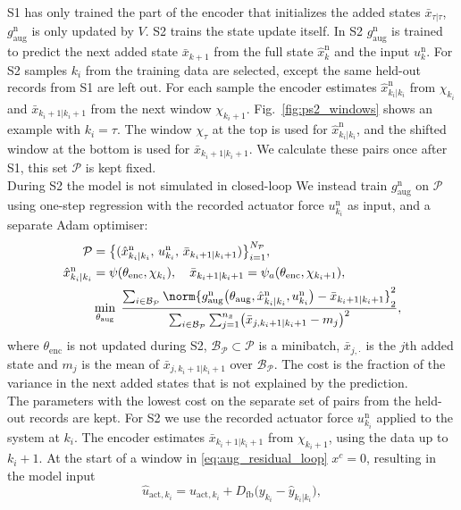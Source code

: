 S1 has only trained the part of the encoder that initializes the 
added states $\bar x_{\tau|\tau}$, $g^{\mathrm n}_{\mathrm{aug}}$ 
is only updated by $V$. 
S2 trains the state update itself.
In S2 $g^{\mathrm n}_{\mathrm{aug}}$ is trained to predict the next
added state $\bar x_{k+1}$ from the full state $\hat x^{\mathrm n}_k$ and the input
$u^{\mathrm n}_k$.
For S2 samples $k_i$ from the training data are selected, 
except the same held-out records from S1 are left out.
For each sample the encoder estimates $\hat x^{\mathrm n}_{k_i|k_i}$ from
$\chi_{k_i}$ and $\bar x_{k_i+1|k_i+1}$ from the next window
$\chi_{k_i+1}$.
Fig.~\ref{fig:ps2_windows} shows an example with $k_i=\tau$.
The window $\chi_\tau$ at the top is used for $\hat x^{\mathrm n}_{k_i|k_i}$,
and the shifted window at the bottom is used for $\bar x_{k_i+1|k_i+1}$.
We calculate these pairs once after S1, this set $\mathcal P$ is kept fixed.
\\
During S2 the model is not simulated in closed-loop 
We instead train $g^{\mathrm n}_{\mathrm{aug}}$ on
$\mathcal P$ using one-step regression with the recorded
actuator force $u^{\mathrm n}_{k_i}$ as input, and a separate Adam optimiser:
\begin{equation}
\begin{aligned}
 \mathcal P&=\bigl\{(\hat x^{\mathrm n}_{k_i|k_i},\,u^{\mathrm n}_{k_i},\,\bar x_{k_i+1|k_i+1})\bigr\}_{i=1}^{N_{\mathcal P}},\\
 \hat x^{\mathrm n}_{k_i|k_i}&=\psi(\theta_{\mathrm{enc}},\chi_{k_i}),\quad
 \bar x_{k_i+1|k_i+1}=\psi_a(\theta_{\mathrm{enc}},\chi_{k_i+1}),\\
 &\min_{\theta_{\mathrm{aug}}}\;
 \frac{\sum_{i\in\mathcal B_{\mathcal P}}\norm{g^{\mathrm n}_{\mathrm{aug}}\bigl(\theta_{\mathrm{aug}},\hat x^{\mathrm n}_{k_i|k_i},u^{\mathrm n}_{k_i}\bigr)-\bar x_{k_i+1|k_i+1}}_2^2}
 {\sum_{i\in\mathcal B_{\mathcal P}}\sum_{j=1}^{n_{\bar x}}\bigl(\bar x_{j,k_i+1|k_i+1}-m_j\bigr)^2},
\end{aligned}
\label{eq:ps2_s2}
\end{equation}
where $\theta_{\mathrm{enc}}$ is not updated during S2,
$\mathcal B_{\mathcal P}\subset\mathcal P$ is a minibatch,
$\bar x_{j,\cdot}$ is the $j$th added state and $m_j$
is the mean of $\bar x_{j,k_i+1|k_i+1}$ over $\mathcal B_{\mathcal P}$.
The cost is the fraction of the variance in the
next added states that is not explained by the prediction.
\\
The parameters with the lowest cost on the separate set of pairs 
from the held-out records are kept.
For S2 we use the recorded actuator force $u^{\mathrm n}_{k_i}$
applied to the system at $k_i$.
The encoder estimates $\bar x_{k_i+1|k_i+1}$ from
$\chi_{k_i+1}$, using the data up to $k_i+1$.
At the start of a window in \eqref{eq:aug_residual_loop}
$x^c=0$, resulting in the model input
\begin{equation*}
 \hat u_{\mathrm{act},k_i}=u_{\mathrm{act},k_i}+D_{\mathrm{fb}}\bigl(y_{k_i}-\hat y_{k_i|k_i}\bigr),
\end{equation*}

